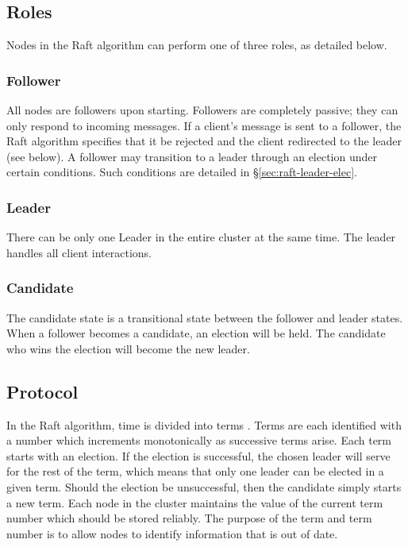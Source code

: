 \documentclass[12pt, a4paper]{article}
\begin{document}
\subsection{Roles}
  Nodes in the Raft algorithm can perform one of three roles, as detailed below.

  \subsubsection{Follower}
  All nodes are followers upon starting. Followers are completely passive; they can only respond to incoming messages. If a client's message is sent to a follower, the Raft algorithm specifies that it be rejected and the client redirected to the leader (see below). A follower may transition to a leader through an election under certain conditions. Such conditions are detailed in \S\ref{sec:raft-leader-elec}.

  \subsubsection{Leader}
  There can be only one Leader in the entire cluster at the same time. The leader handles all client interactions.

  \subsubsection{Candidate}
  The candidate state is a transitional state between the follower and leader states. When a follower becomes a candidate, an election will be held. The candidate who wins the election will become the new leader.

\subsection{Protocol}
In the Raft algorithm, time is divided into terms \cite{conf/usenix/OngaroO14}. Terms are each identified with a number which increments monotonically as successive terms arise. Each term starts with an election. If the election is successful, the chosen leader will serve for the rest of the term, which means that only one leader can be elected in a given term. Should the election be unsuccessful, then the candidate simply starts a new term. Each node in the cluster maintains the value of the current term number which should be stored reliably. The purpose of the term and term number is to allow nodes to identify information that is out of date.
\end{document}
